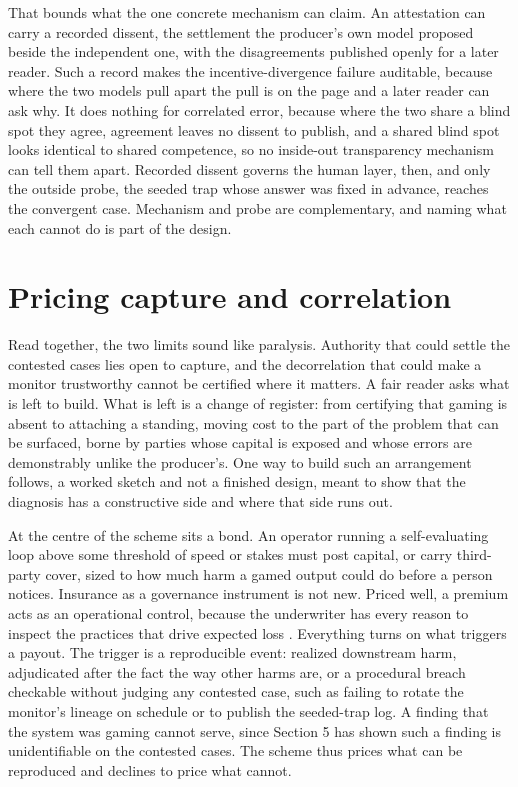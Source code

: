 \documentclass[11pt]{article}
\begin{document}
That bounds what the one concrete mechanism can claim. An attestation can carry a recorded dissent, the settlement the producer's own model proposed beside the independent one, with the disagreements published openly for a later reader. Such a record makes the incentive-divergence failure auditable, because where the two models pull apart the pull is on the page and a later reader can ask why. It does nothing for correlated error, because where the two share a blind spot they agree, agreement leaves no dissent to publish, and a shared blind spot looks identical to shared competence, so no inside-out transparency mechanism can tell them apart. Recorded dissent governs the human layer, then, and only the outside probe, the seeded trap whose answer was fixed in advance, reaches the convergent case. Mechanism and probe are complementary, and naming what each cannot do is part of the design.

\section{Pricing capture and correlation}

Read together, the two limits sound like paralysis. Authority that could settle the contested cases lies open to capture, and the decorrelation that could make a monitor trustworthy cannot be certified where it matters. A fair reader asks what is left to build. What is left is a change of register: from certifying that gaming is absent to attaching a standing, moving cost to the part of the problem that can be surfaced, borne by parties whose capital is exposed and whose errors are demonstrably unlike the producer's. One way to build such an arrangement follows, a worked sketch and not a finished design, meant to show that the diagnosis has a constructive side and where that side runs out.

At the centre of the scheme sits a bond. An operator running a self-evaluating loop above some threshold of speed or stakes must post capital, or carry third-party cover, sized to how much harm a gamed output could do before a person notices. Insurance as a governance instrument is not new. Priced well, a premium acts as an operational control, because the underwriter has every reason to inspect the practices that drive expected loss \citep{bertsimas2021}. Everything turns on what triggers a payout. The trigger is a reproducible event: realized downstream harm, adjudicated after the fact the way other harms are, or a procedural breach checkable without judging any contested case, such as failing to rotate the monitor's lineage on schedule or to publish the seeded-trap log. A finding that the system was gaming cannot serve, since Section 5 has shown such a finding is unidentifiable on the contested cases. The scheme thus prices what can be reproduced and declines to price what cannot.
\end{document}
